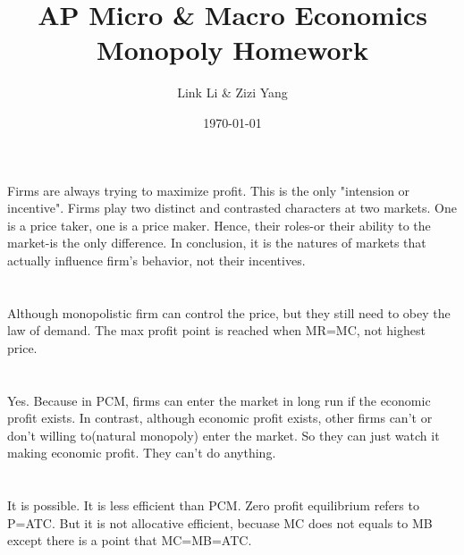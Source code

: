 \documentclass[12pt]{article}
\title{AP Micro \& Macro Economics Monopoly Homework}
\author{Link Li \& Zizi Yang\pgfornament[width=0.7cm]{94}}
\date{\today}
\begin{document}
\maketitle

\section{}

Firms are always trying to maximize profit. This is the only "intension or incentive". Firms play two distinct and contrasted characters at two markets. One is a price taker, one is a price maker. Hence, their roles-or their ability to the market-is the only difference. In conclusion, it is the natures of markets that actually influence firm's behavior, not their incentives.


\section{}

Although monopolistic firm can control the price, but they still need to obey the law of demand. The max profit point is reached when MR=MC, not highest price.

\section{}

Yes. Because in PCM, firms can enter the market in long run if the economic profit exists. In contrast, although economic profit exists, other firms can't or don't willing to(natural monopoly) enter the market. So they can just watch it making economic profit. They can't do anything. 


\section{}


It is possible. It is less efficient than PCM. Zero profit equilibrium refers to P=ATC. But it is not allocative efficient, becuase MC does not equals to MB except there is a point that MC=MB=ATC.


\section{}
\end{document}
